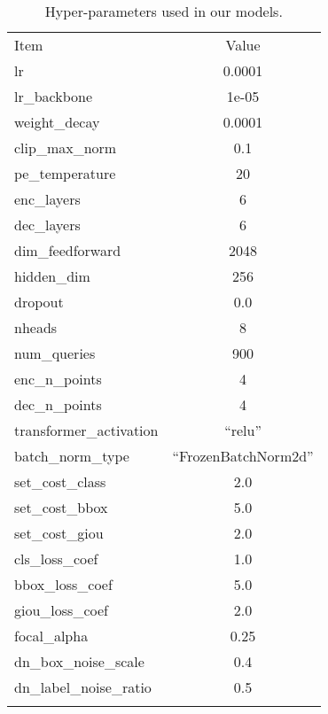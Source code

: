 \documentclass[runningheads]{llncs}
\begin{document}
\begin{table}[]
    \centering
    \begin{tabular}{l|c}
	\shline
	Item & Value \\
	\shline
	lr & 0.0001 \\ \hline
	lr\_backbone & 1e-05 \\ \hline
	weight\_decay & 0.0001 \\ \hline
	clip\_max\_norm & 0.1 \\ \hline
	pe\_temperature & 20 \\ \hline
	enc\_layers & 6 \\ \hline
	dec\_layers & 6 \\ \hline
	dim\_feedforward & 2048 \\ \hline
	hidden\_dim & 256 \\ \hline
	dropout & 0.0 \\ \hline
	nheads & 8 \\ \hline
	num\_queries & 900 \\ \hline
	enc\_n\_points & 4 \\ \hline
	dec\_n\_points & 4 \\ \hline
	transformer\_activation & ``relu'' \\ \hline
	batch\_norm\_type & ``FrozenBatchNorm2d'' \\ \hline
set\_cost\_class & 2.0 \\ \hline
	set\_cost\_bbox & 5.0 \\ \hline
	set\_cost\_giou & 2.0 \\ \hline
	cls\_loss\_coef & 1.0 \\ \hline
	bbox\_loss\_coef & 5.0 \\ \hline
	giou\_loss\_coef & 2.0 \\ \hline
	focal\_alpha & 0.25 \\ \hline
	dn\_box\_noise\_scale & 0.4 \\ \hline
	dn\_label\_noise\_ratio & 0.5 \\ \hline
	\shline
    \end{tabular}
    \vspace{0.2cm}
    \caption{Hyper-parameters used in our models.}
    \label{tab:hyperparameters}
\end{table}

 
\end{document}
